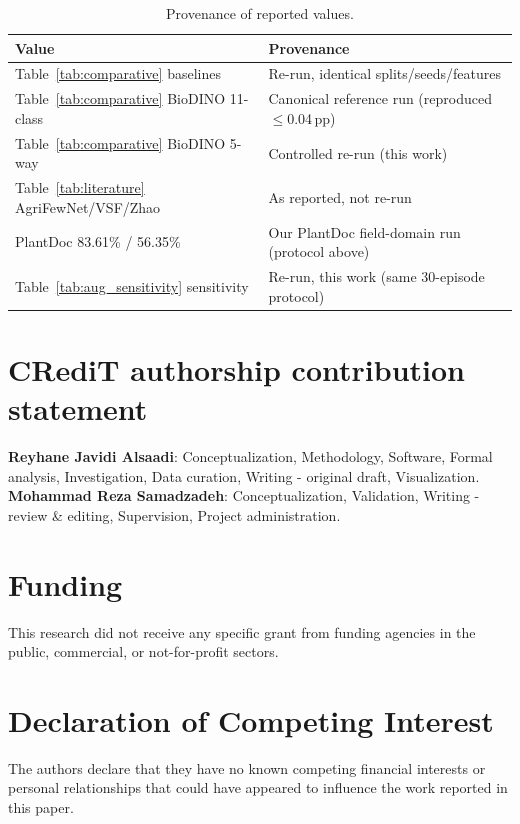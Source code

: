 \documentclass[preprint,12pt]{elsarticle}
\begin{document}
\begin{table}[htbp]
\caption{Provenance of reported values.}
\label{tab:provenance}
\centering

\footnotesize
\begin{tabularx}{\columnwidth}{l X}
\toprule
\textbf{Value} & \textbf{Provenance} \\
\midrule
Table~\ref{tab:comparative} baselines & Re-run, identical splits/seeds/features \\
Table~\ref{tab:comparative} BioDINO 11-class & Canonical reference run (reproduced $\le$0.04\,pp) \\
Table~\ref{tab:comparative} BioDINO 5-way & Controlled re-run (this work) \\
Table~\ref{tab:literature} AgriFewNet/VSF/Zhao & As reported, not re-run \\
PlantDoc 83.61\% / 56.35\% & Our PlantDoc field-domain run (protocol above) \\
Table~\ref{tab:aug_sensitivity} sensitivity & Re-run, this work (same 30-episode protocol) \\
\bottomrule
\end{tabularx}
\end{table}

\section*{CRediT authorship contribution statement}
\textbf{Reyhane Javidi Alsaadi}: Conceptualization, Methodology, Software, Formal analysis, Investigation, Data curation, Writing - original draft, Visualization.
\textbf{Mohammad Reza Samadzadeh}: Conceptualization, Validation, Writing - review \& editing, Supervision, Project administration.

\section*{Funding}
This research did not receive any specific grant from funding agencies in the public, commercial, or not-for-profit sectors.

\section*{Declaration of Competing Interest}
The authors declare that they have no known competing financial interests or personal relationships that could have appeared to influence the work reported in this paper.
\end{document}
